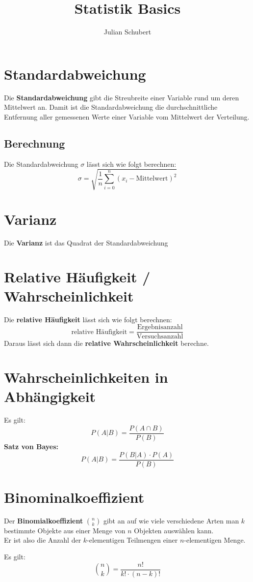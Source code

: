 \documentclass[14pt]{article}
\title{Statistik Basics}
\author{Julian Schubert}
\begin{document}
\section{Standardabweichung}
    \begin{definition}[Standardabweichung]
        Die \textbf{Standardabweichung} gibt die Streubreite einer Variable rund 
        um deren Mittelwert an. Damit ist die Standardabweichung die 
        durchschnittliche Entfernung aller gemessenen Werte einer Variable vom 
        Mittelwert der Verteilung.
    \end{definition}
    \subsection{Berechnung}
    Die Standardabweichung $\sigma$ lässt sich wie folgt berechnen: 
    \[
        \sigma = \sqrt{\frac{1}{n} \sum_{i=0}^n(x_i - \text{Mittelwert})^2}
    \]

\section{Varianz}
    \begin{definition}[Varianz]
        Die \textbf{Varianz} ist das Quadrat der Standardabweichung
    \end{definition}

\section{Relative Häufigkeit / Wahrscheinlichkeit}
    Die \textbf{relative Häufigkeit} lässt sich wie folgt berechnen:
    \[
        \text{relative Häufigkeit} 
            = \frac{\text{Ergebnisanzahl}}{\text{Versuchsanzahl}}  
    \]
    Daraus lässt sich dann die \textbf{relative Wahrscheinlichkeit}
    berechne.

\section{Wahrscheinlichkeiten in Abhängigkeit}
    Es gilt: 
    \[
        P(A | B) = \frac{P(A \cap B)}{P(B)}
    \]
    \textbf{Satz von Bayes:}
    \[
        P(A | B) = \frac{P(B | A) \cdot P(A)}{P(B)}
    \]

\section{Binominalkoeffizient}
    \begin{definition}[Binominalkoeffizient]
        Der \textbf{Binomialkoeffizient} $\binom{n}{k}$ gibt an auf 
        wie viele verschiedene Arten man  $k$ bestimmte Objekte aus 
        einer Menge von $n$ Objekten auswählen kann. \\
        Er ist also die Anzahl der $k$-elementigen Teilmengen 
        einer $n$-elementigen Menge.
    \end{definition}
    Es gilt:
    \[
        \binom{n}{k} = \frac{n!}{k! \cdot (n - k)!}
    \]  
\end{document}
